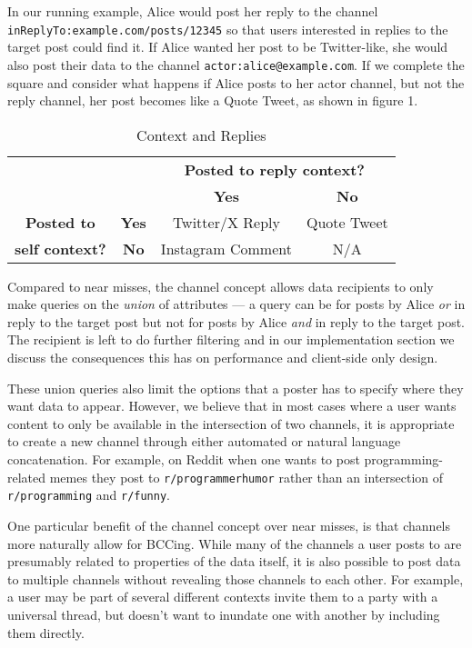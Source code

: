 In our running example, Alice would post her reply to the channel \texttt{inReplyTo:example.com/posts/12345} so that users interested in replies to the target post could find it.
If Alice wanted her post to be Twitter-like, she would also post their data to the channel \texttt{actor:alice@example.com}.
If we complete the square and consider what happens if Alice posts to her actor channel, but not the reply channel, her post becomes like a Quote Tweet, as shown in figure 1.

\begin{table}[htbp]
    \centering
    \caption{Context and Replies}
    \label{tab:reply_dimensions}
    \begin{tabular}{c|c|c|c|}
    \multicolumn{2}{c}{}
    & \multicolumn{2}{c}{\textbf{Posted to reply context?}}
    \\ \cline{3-4}
    \multicolumn{2}{c|}{}
    & \textbf{Yes} & \textbf{No}
    \\ \cline{2-4}
    \textbf{Posted to}
    & \textbf{Yes}
    & Twitter/X Reply & Quote Tweet
    \\ \cline{2-4}
    \textbf{self context?}
    & \textbf{No}
    & Instagram Comment & N/A
    \\ \cline{2-4}
    \end{tabular}
\end{table}

Compared to near misses, the channel concept allows data recipients to only make queries on the \emph{union} of attributes --- a query can be for posts by Alice \emph{or} in reply to the target post but not for posts by Alice \emph{and} in reply to the target post. The recipient is left to do further filtering and in our implementation section we discuss the consequences this has on performance and client-side only design.

These union queries also limit the options that a poster has to specify where they want data to appear. However, we believe that in most cases where a user wants content to only be available in the intersection of two channels, it is appropriate to create a new channel through either automated or natural language concatenation.
For example, on Reddit when one wants to post programming-related memes they post to \texttt{r/programmerhumor} rather than an intersection of \texttt{r/programming} and \texttt{r/funny}.

One particular benefit of the channel concept over near misses, is that channels more naturally allow for BCCing.
While many of the channels a user posts to are presumably related to properties of the data itself, it is also possible to post data to multiple channels without revealing those channels to each other.
For example, a user may be part of several different contexts invite them to a party with a universal thread, but doesn't want to inundate one with another by including them directly.

